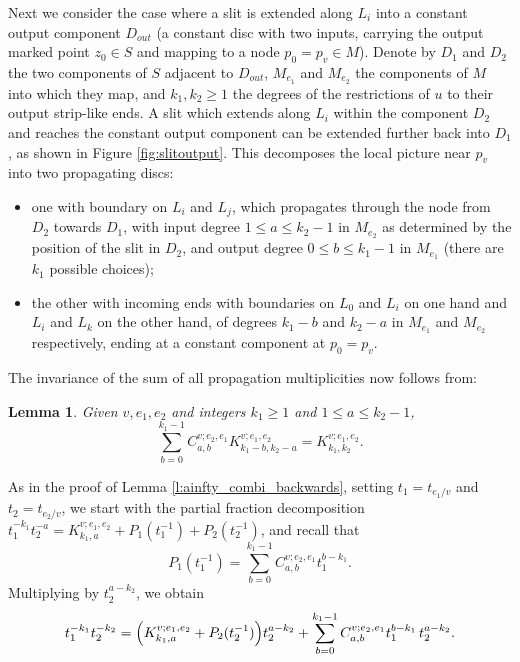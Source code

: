 \documentclass[11pt,leqno]{amsart}
\newtheorem{lemma}[theo]{Lemma}
\numberwithin{equation}{section}
\begin{document}
Next we consider the case where a slit is extended along $L_i$ 
into a constant output component $D_{out}$ (a constant disc with 
two inputs, carrying the output marked point $z_0\in S$ and mapping to a node $p_0=p_v\in M$). 
Denote by $D_1$ and $D_2$ the two components of $S$ adjacent to $D_{out}$,
$M_{e_1}$ and $M_{e_2}$ the components of $M$ into which they map,  and
$k_1,k_2\geq 1$ the degrees of the restrictions of $u$ to their output strip-like ends.
A slit which extends along $L_i$ within the component $D_2$ and reaches the constant
output component can be extended further back into $D_1$, as shown in
Figure \ref{fig:slitoutput}. This decomposes the local picture near $p_v$
into two propagating discs:
\begin{itemize}
\item one with boundary on $L_i$ and $L_j$, which propagates
through the node from $D_2$ towards $D_1$, with input degree $1\leq a\leq
k_2-1$ in $M_{e_2}$ as
determined by the position of the slit in $D_2$, and output degree $0\leq
b\leq k_1-1$ in $M_{e_1}$ (there are $k_1$ possible choices);
\item the other with incoming ends with boundaries on $L_0$ and $L_i$ on one
hand and $L_i$ and $L_k$ on the other hand, of degrees $k_1-b$ and $k_2-a$
in $M_{e_1}$ and $M_{e_2}$ respectively, ending at a constant component at
$p_0=p_v$.
\end{itemize}
The invariance of the sum of all propagation multiplicities now follows from:
\begin{lemma} \label{l:ainfty_combi_outputbounce} Given $v,e_1,e_2$ and integers $k_1\geq 1$ and $1\leq a\leq k_2-1$,
\begin{equation}\label{eq:ainfty_combi_outputbounce}
\sum_{b=0}^{k_1-1} C_{a,b}^{v;e_2,e_1} K_{k_1-b,k_2-a}^{v;e_1,e_2}=
K_{k_1,k_2}^{v;e_1,e_2}.
\end{equation}
\end{lemma}
\proof
As in the proof of Lemma \ref{l:ainfty_combi_backwards}, setting $t_1=t_{e_1/v}$ and 
$t_2=t_{e_2/v}$, we start with the partial fraction decomposition
$t_1^{-k_1}t_2^{-a}=K_{k_1,a}^{v;e_1,e_2}+P_1(t_1^{-1})+P_2(t_2^{-1})$, and
recall that $$P_1(t_1^{-1})=\sum_{b=0}^{k_1-1}
C_{a,b}^{v;e_2,e_1} t_1^{b-k_1}.$$
Multiplying by $t_2^{a-k_2}$, we obtain 
\begin{equation}\label{eq:ainfty_combi_lemma}
t_1^{-k_1}t_2^{-k_2}=\Bigl(K_{k_1,a}^{v;e_1,e_2}+P_2(t_2^{-1})\Bigr) t_2^{a-k_2}+
\sum_{b=0}^{k_1-1} C_{a,b}^{v;e_2,e_1} t_1^{b-k_1}\,t_2^{a-k_2}.
\end{equation}
\end{document}
